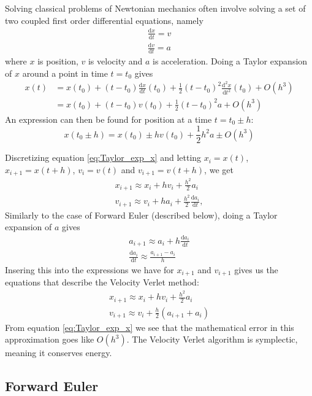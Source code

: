 \documentclass[reprint, english,notitlepage,nofootinbib]{revtex4-1}  %
\begin{document}
Solving classical problems of Newtonian mechanics often involve solving a set of two coupled first order differential equations, namely
\begin{align*}
  \frac{\mathrm d x}{\mathrm dt} = v \\
  \frac{\mathrm d v}{\mathrm dt} = a
\end{align*}
where $x$ is position, $v$ is velocity and $a$ is acceleration. Doing a Taylor expansion of $x$ around a point in time $t = t_0$ gives
\begin{align*}
  x(t) &= x(t_0) + (t - t_0) \frac{\mathrm d x}{\mathrm dt}(t_0) + \frac{1}{2} (t - t_0)^2 \frac{\mathrm d^2 x}{\mathrm dt^2}(t_0) + O(h^3) \\
  &= x(t_0) + (t - t_0) v(t_0) + \frac{1}{2} (t - t_0)^2 a + O(h^3)
\end{align*}
An expression can then be found for position at a time $t = t_0 \pm h$:
\begin{equation}
  \label{eq:Taylor_exp_x}
  x(t_0 \pm h) = x(t_0) \pm h v(t_0) + \frac{1}{2} h^2 a \pm O(h^3)
\end{equation}

Discretizing equation \eqref{eq:Taylor_exp_x} and letting $x_i = x(t)$, $x_{i+1} = x(t + h)$, $v_i = v(t)$ and $v_{i+1} = v(t + h)$, we get
\begin{align*}
  x_{i+1} \approx x_i + h v_i + \frac{h^2}{2} a_i \\
  v_{i+1} \approx v_i + h a_i + \frac{h^2}{2} \frac{\mathrm d a_i}{\mathrm d t},
\end{align*}
Similarly to the case of Forward Euler (described below), doing a Taylor expansion of $a$ gives
\begin{align*}
  a_{i+1} \approx a_i + h \frac{\mathrm d a_i}{\mathrm d t} \\
  \frac{\mathrm d a_i}{\mathrm d t} \approx \frac{a_{i+1} - a_i}{h}
\end{align*}
Insering this into the expressions we have for $x_{i+1}$ and $v_{i+1}$ gives us the equations that describe the Velocity Verlet method:
\begin{align*}
  x_{i+1} \approx x_i + h v_i + \frac{h^2}{2} a_i \\
  v_{i+1} \approx v_i + \frac{h}{2} (a_{i+1} + a_i)
\end{align*}
From equation \eqref{eq:Taylor_exp_x} we see that the mathematical error in this approximation goes like $O(h^3)$. The Velocity Verlet algorithm is symplectic, meaning it conserves energy.


\subsection{Forward Euler}
\end{document}
